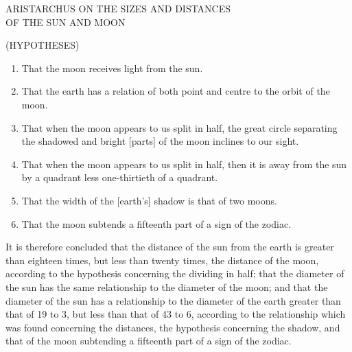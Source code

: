 \documentclass[a4paper,14pt]{memoir}
\begin{document}
\newpage

\begin{center}
{%
{\large
ARISTARCHUS
ON THE SIZES AND DISTANCES\\ OF THE SUN AND MOON
}

(HYPOTHESES)
}
\end{center}

\begin{enumerate}
\item That the moon receives light from the sun.
\item That the earth has a relation of both point and centre to the orbit of the moon.
\item That when the moon appears to us split in half, the great circle separating the shadowed and bright [parts] of the moon inclines to our sight.
\item That when the moon appears to us split in half, then it is away from the sun by a quadrant less one-thirtieth of a quadrant.
\item That the width of the [earth's] shadow is that of two moons.
\item That the moon subtends a fifteenth part of a sign of the zodiac.
\end{enumerate}
\medskip

It is therefore concluded that the distance of the sun from the earth is greater than eighteen times, but less than twenty times, the distance of the moon, according to the hypothesis concerning the dividing in half; that the diameter of the sun has the same relationship to the diameter of the moon; and that the diameter of the sun has a relationship to the diameter of the earth greater than that of 19 to 3, but less than that of 43 to 6, according to the relationship which was found concerning the distances, the hypothesis concerning the shadow, and that of the moon subtending a fifteenth part of a sign of the zodiac. 


\newpage
\raggedright
\end{document}
